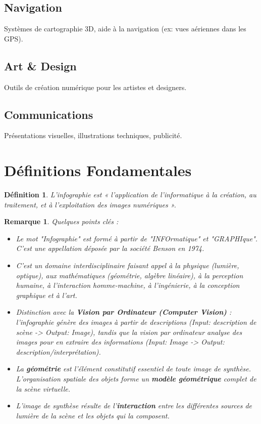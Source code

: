 \documentclass{article}
\newtheorem{definition}{Définition}
\newtheorem{remark}{Remarque}
\begin{document}
\subsection{Navigation}
Systèmes de cartographie 3D, aide à la navigation (ex: vues aériennes dans les GPS).
\subsection{Art \& Design}
Outils de création numérique pour les artistes et designers.
\subsection{Communications}
Présentations visuelles, illustrations techniques, publicité.
\section{Définitions Fondamentales}
\begin{definition}
L'infographie est « l'application de l'informatique à la création, au traitement, et à l'exploitation des images numériques ».
\end{definition}
\begin{remark}
Quelques points clés :
\begin{itemize}
    \item Le mot "Infographie" est formé à partir de "INFOrmatique" et "GRAPHIque". C'est une appellation déposée par la société Benson en 1974.
    \item C'est un domaine interdisciplinaire faisant appel à la physique (lumière, optique), aux mathématiques (géométrie, algèbre linéaire), à la perception humaine, à l'interaction homme-machine, à l'ingénierie, à la conception graphique et à l'art.
    \item Distinction avec la \textbf{Vision par Ordinateur (Computer Vision)} : l'infographie génère des images à partir de descriptions (Input: description de scène -> Output: Image), tandis que la vision par ordinateur analyse des images pour en extraire des informations (Input: Image -> Output: description/interprétation).
    \item La \textbf{géométrie} est l'élément constitutif essentiel de toute image de synthèse. L'organisation spatiale des objets forme un \textbf{modèle géométrique} complet de la scène virtuelle.
    \item L'image de synthèse résulte de l'\textbf{interaction} entre les différentes sources de lumière de la scène et les objets qui la composent.
\end{itemize}
\end{remark}
\end{document}
